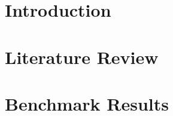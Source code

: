 \chapter{Introduction}
\chapter{Literature Review}
\label{chapter:lit-review}



% 




\chapter{Benchmark Results}







